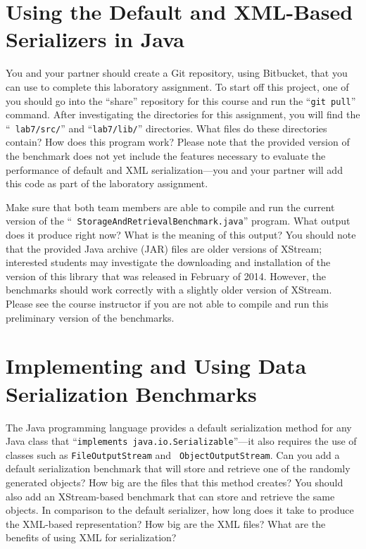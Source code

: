 \vspace*{-.05in}
\section*{Using the Default and XML-Based Serializers in Java}

You and your partner should create a Git repository, using Bitbucket, that you can use to complete this laboratory
assignment.  To start off this project, one of you should go into the ``share'' repository for this course and run the
``{\tt git pull}'' command. After investigating the directories for this assignment, you will find the ``{\tt
  lab7/src/}'' and ``{\tt lab7/lib/}'' directories. What files do these directories contain? How does this program work?
Please note that the provided version of the benchmark does not yet include the features necessary to evaluate the
performance of default and XML serialization---you and your partner will add this code as part of the laboratory
assignment.

Make sure that both team members are able to compile and run the current version of the ``{\tt
  StorageAndRetrievalBenchmark.java}'' program. What output does it produce right now? What is the meaning of this
output? You should note that the provided Java archive (JAR) files are older versions of XStream; interested students may
investigate the downloading and installation of the version of this library that was released in February of 2014.
However, the benchmarks should work correctly with a slightly older version of XStream. Please see the course instructor
if you are not able to compile and run this preliminary version of the benchmarks.

\vspace*{-.05in}
\section*{Implementing and Using Data Serialization Benchmarks}

The Java programming language provides a default serialization method for any Java class that ``{\tt implements
  java.io.Serializable}''---it also requires the use of classes such as {\tt FileOutputStream} and {\tt
  ObjectOutputStream}. Can you add a default serialization benchmark that will store and retrieve one of the randomly
generated objects? How big are the files that this method creates?  You should also add an XStream-based benchmark that
can store and retrieve the same objects. In comparison to the default serializer, how long does it take to produce the
XML-based representation? How big are the XML files? What are the benefits of using XML for serialization?

